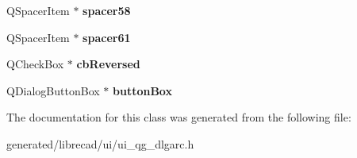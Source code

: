 \begin{DoxyCompactItemize}
\item 
\hypertarget{classUi__QG__DlgArc_a9e4e9778cf9f19afbf87c28775f99748}{Q\-Spacer\-Item $\ast$ {\bfseries spacer58}}\label{classUi__QG__DlgArc_a9e4e9778cf9f19afbf87c28775f99748}

\item 
\hypertarget{classUi__QG__DlgArc_a1b0b40db7bad8ff4a2c1e086a61bcee3}{Q\-Spacer\-Item $\ast$ {\bfseries spacer61}}\label{classUi__QG__DlgArc_a1b0b40db7bad8ff4a2c1e086a61bcee3}

\item 
\hypertarget{classUi__QG__DlgArc_a67c4b6acea215b6a8edb752ad1a5fefb}{Q\-Check\-Box $\ast$ {\bfseries cb\-Reversed}}\label{classUi__QG__DlgArc_a67c4b6acea215b6a8edb752ad1a5fefb}

\item 
\hypertarget{classUi__QG__DlgArc_a7a4af247a4c9f0f63437600aad04a1c5}{Q\-Dialog\-Button\-Box $\ast$ {\bfseries button\-Box}}\label{classUi__QG__DlgArc_a7a4af247a4c9f0f63437600aad04a1c5}

\end{DoxyCompactItemize}


The documentation for this class was generated from the following file\-:\begin{DoxyCompactItemize}
\item 
generated/librecad/ui/ui\-\_\-qg\-\_\-dlgarc.\-h\end{DoxyCompactItemize}
